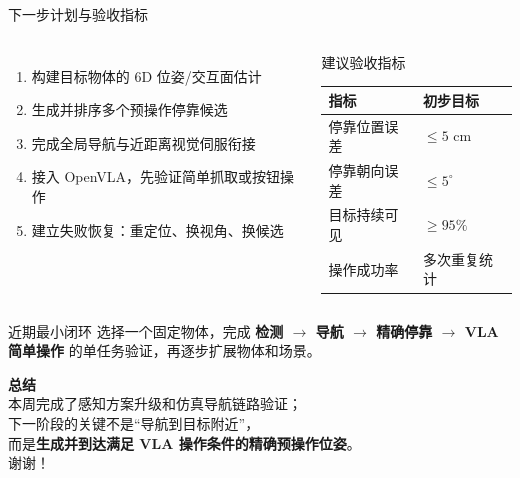 \documentclass[aspectratio=169,10pt]{ctexbeamer}
\begin{document}
\begin{frame}{下一步计划与验收指标}
  \begin{columns}[T,onlytextwidth]
      \begin{enumerate}
        \item 构建目标物体的 6D 位姿/交互面估计
        \item 生成并排序多个预操作停靠候选
        \item 完成全局导航与近距离视觉伺服衔接
        \item 接入 OpenVLA，先验证简单抓取或按钮操作
        \item 建立失败恢复：重定位、换视角、换候选
      \end{enumerate}

      \begin{block}{建议验收指标}
        \begin{tabular}{@{}ll@{}}
          \toprule
          指标 & 初步目标 \\
          \midrule
          停靠位置误差 & $\leq 5$ cm \\
          停靠朝向误差 & $\leq 5^\circ$ \\
          目标持续可见 & $\geq 95\%$ \\
          操作成功率 & 多次重复统计 \\
          \bottomrule
        \end{tabular}
      \end{block}
  \end{columns}

  \vspace{0.35cm}
  \begin{alertblock}{近期最小闭环}
    选择一个固定物体，完成
    \textbf{检测 $\rightarrow$ 导航 $\rightarrow$ 精确停靠 $\rightarrow$ VLA 简单操作}
    的单任务验证，再逐步扩展物体和场景。
  \end{alertblock}
\end{frame}

\begin{frame}[plain]
  \begin{center}
    \vspace{1.3cm}
    {\LARGE\bfseries 总结}\\[0.8cm]
    {\large
      本周完成了感知方案升级和仿真导航链路验证；\\[0.35cm]
      下一阶段的关键不是“导航到目标附近”，\\[0.2cm]
      而是\alert{\textbf{生成并到达满足 VLA 操作条件的精确预操作位姿}}。
    }\\[1.2cm]
    {\Large 谢谢！}
  \end{center}
\end{frame}
\end{document}

